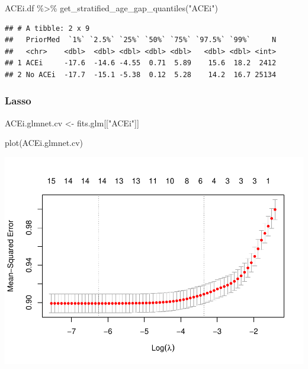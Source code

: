 \documentclass[
]{article}
\newenvironment{Shaded}{\begin{snugshade}}{\end{snugshade}}
\newcommand{\FunctionTok}[1]{\textcolor[rgb]{0.00,0.00,0.00}{#1}}
\newcommand{\NormalTok}[1]{#1}
\newcommand{\OtherTok}[1]{\textcolor[rgb]{0.56,0.35,0.01}{#1}}
\newcommand{\SpecialCharTok}[1]{\textcolor[rgb]{0.00,0.00,0.00}{#1}}
\newcommand{\StringTok}[1]{\textcolor[rgb]{0.31,0.60,0.02}{#1}}
\begin{document}
\begin{Shaded}
\begin{Highlighting}[]
\NormalTok{ACEi.df }\SpecialCharTok{\%\textgreater{}\%} 
   \FunctionTok{get\_stratified\_age\_gap\_quantiles}\NormalTok{(}\StringTok{"ACEi"}\NormalTok{)}
\end{Highlighting}
\end{Shaded}

\begin{verbatim}
## # A tibble: 2 x 9
##   PriorMed  `1%` `2.5%` `25%` `50%` `75%` `97.5%` `99%`     N
##   <chr>    <dbl>  <dbl> <dbl> <dbl> <dbl>   <dbl> <dbl> <int>
## 1 ACEi     -17.6  -14.6 -4.55  0.71  5.89    15.6  18.2  2412
## 2 No ACEi  -17.7  -15.1 -5.38  0.12  5.28    14.2  16.7 25134
\end{verbatim}

\hypertarget{lasso-4}{%
\subsubsection{Lasso}\label{lasso-4}}

\begin{Shaded}
\begin{Highlighting}[]
\NormalTok{ACEi.glmnet.cv }\OtherTok{\textless{}{-}}\NormalTok{ fits.glm[[}\StringTok{"ACEi"}\NormalTok{]]}
\end{Highlighting}
\end{Shaded}

\begin{Shaded}
\begin{Highlighting}[]
\FunctionTok{plot}\NormalTok{(ACEi.glmnet.cv) }
\end{Highlighting}
\end{Shaded}

\includegraphics{../results/report_files/figure-latex/ACEi-lasso-plot-1.pdf}
\end{document}
